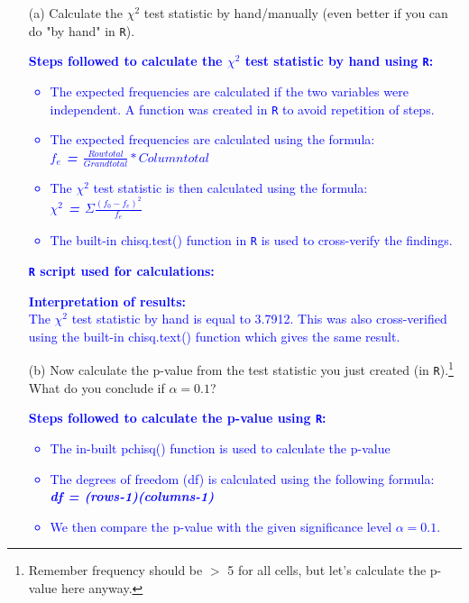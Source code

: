 \documentclass[12pt,letterpaper]{article}
\begin{document}
\begin{enumerate}
	
	\item [(a)]
	Calculate the $\chi^2$ test statistic by hand/manually (even better if you can do "by hand" in \texttt{R}).
	
\textcolor{blue}{
\textbf{Steps followed to calculate the $\chi^2$ test statistic by hand using \texttt{R}:}
\begin{itemize}
	\item The expected frequencies are calculated if the two variables were independent. A function was created in \texttt{R} to avoid repetition of steps.
	\item The expected frequencies are calculated using the formula:
	\vspace{0.2cm}\\
	\textbf{\textit{$f_e$ = $\frac{Row total}{Grand total} * Column total$}}
	\item The $\chi^2$ test statistic is then calculated using the formula:
	\vspace*{0.2cm}\\
	\textbf{\textit{$\chi^2$ = $\Sigma \frac{(f_0 - f_e)^2}{f_e}$}}
	\item The built-in chisq.test() function in \texttt{R} is used to cross-verify the findings.
\end{itemize}
}

\vspace{0.2cm}
\textcolor{blue}{
	\textbf{\texttt{R} script used for calculations:}
}



\vspace*{0.5cm}
\textcolor{blue}{
	\textbf{Interpretation of results:}\\
	The $\chi^2$ test statistic by hand is equal to 3.7912. This was also cross-verified using the built-in chisq.text() function which gives the same result.
}

\pagebreak

	\item [(b)]
	Now calculate the p-value from the test statistic you just created (in \texttt{R}).\footnote{Remember frequency should be $>$ 5 for all cells, but let's calculate the p-value here anyway.}  What do you conclude if $\alpha = 0.1$?\\

	
\textcolor{blue}{
	\textbf{Steps followed to calculate the p-value using \texttt{R}:}
\begin{itemize}
\item The in-built pchisq() function is used to calculate the p-value
\item The degrees of freedom (df) is calculated using the following formula:
\vspace{0.2cm}\\
\textit{\textbf{df = (rows-1)(columns-1)}}
\item We then compare the p-value with the given significance level $\alpha = 0.1$.
\end{itemize}
}


\end{enumerate}
\end{document}
